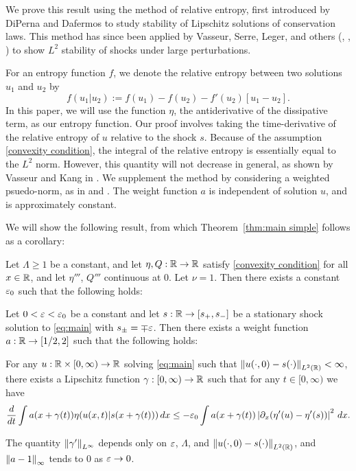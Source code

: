 We prove this result using the method of relative entropy, first introduced by DiPerna and Dafermos \cite{Da} to study stability of Lipschitz solutions of conservation laws.  This method has since been applied by Vasseur, Serre, Leger, and others (\cite{SeVa}, \cite{LeVa}, \cite{Le}) to show $L^2$ stability of shocks under large perturbations.  

For an entropy function $f$, we denote the relative entropy between two solutions $u_1$ and $u_2$ by
\[ f(u_1|u_2) := f(u_1) - f(u_2) - f'(u_2) [u_1-u_2]. \]
In this paper, we will use the function $\eta$, the antiderivative of the dissipative term, as our entropy function.  Our proof involves taking the time-derivative of the relative entropy of $u$ relative to the shock $s$.  Because of the assumption \eqref{convexity condition}, the integral of the relative entropy is essentially equal to the $L^2$ norm.  However, this quantity will not decrease in general, as shown by Vasseur and Kang in \cite{KaVa.burgers}.  We supplement the method by considering a weighted psuedo-norm, as in \cite{Va.entropy} and \cite{Va.recent}.  The weight function $a$ is independent of solution $u$, and is approximately constant.  

We will show the following result, from which Theorem~\ref{thm:main simple} follows as a corollary:
\begin{theorem} \label{thm:main technical}
Let $\Lambda \geq 1$ be a constant, and let $\eta, Q: \mathbb{R} \to \mathbb{R}$ satisfy \eqref{convexity condition} for all $x \in \mathbb{R}$, and let $\eta'''$, $Q'''$ continuous at 0.  Let $\nu = 1$.  Then there exists a constant $\varepsilon_0$ such that the following holds:

Let $0 < \varepsilon < \varepsilon_0$ be a constant and let $s: \mathbb{R} \to [s_+,s_-]$ be a stationary shock solution to \eqref{eq:main} with $s_\pm = \mp \varepsilon$.  Then there exists a weight function $a:\mathbb{R} \to [1/2,2]$ such that the following holds:

For any $u:\mathbb{R}\times[0,\infty)\to\mathbb{R}$ solving \eqref{eq:main} such that $\left\lVert u(\cdot,0) - s(\cdot)\right\rVert_{L^2(\mathbb{R})} < \infty$, there exists a Lipschitz function $\gamma:[0,\infty) \to \mathbb{R}$ such that for any $t \in [0,\infty)$ we have
\[ \frac{d}{dt} \int a(x + \gamma(t)) \eta(u(x,t)|s(x+\gamma(t))) \,dx \leq -\varepsilon_0 \int a(x+\gamma(t)) \left\lvert \partial_x(\eta'(u)-\eta'(s)) \right\rvert^2 \,dx. \]

The quantity $\left\lVert\gamma'\right\rVert_{L^\infty}$ depends only on $\varepsilon$, $\Lambda$, and $\left\lVert u(\cdot,0) - s(\cdot)\right\rVert_{L^2(\mathbb{R})}$, and $\left\lVert a-1\right\rVert_\infty$ tends to 0 as $\varepsilon \to 0$.  
\end{theorem}

